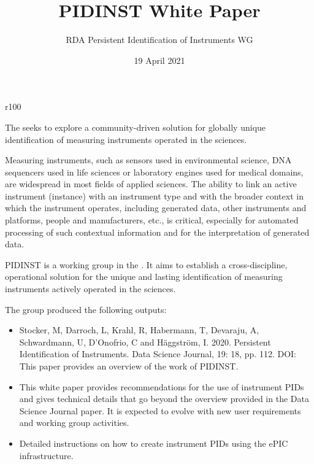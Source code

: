 \documentclass[a4paper,10pt,english]{sphinxmanual}
\title{PIDINST White Paper}
\date{19 April 2021}
\author{RDA Persistent Identification of Instruments WG}
\let\sphinxpxdimen\pdfpxdimen\else\newdimen\sphinxpxdimen
\begin{document}
\pagestyle{empty}
\sphinxmaketitle

\pagestyle{plain}
\label{\detokenize{index::doc}}
\begin{wrapfigure}{r}{100\sphinxpxdimen}
  \sphinxincludegraphics[width=100\sphinxpxdimen]{{pidinst-logo}.pdf}
\end{wrapfigure}
The  seeks to explore a community-driven solution for globally
unique identification of measuring instruments operated in the
sciences.

Measuring instruments, such as sensors used in environmental science,
DNA sequencers used in life sciences or laboratory engines used for
medical domains, are widespread in most fields of applied sciences.
The ability to link an active instrument (instance) with an instrument
type and with the broader context in which the instrument operates,
including generated data, other instruments and platforms, people and
manufacturers, etc., is critical, especially for automated processing
of such contextual information and for the interpretation of generated
data.

PIDINST is a working group in the .  It aims to establish a cross-discipline, operational
solution for the unique and lasting identification of measuring
instruments actively operated in the sciences.

The group produced the following outputs:
\begin{itemize}
\item {} 
Stocker, M, Darroch, L, Krahl, R, Habermann, T, Devaraju, A,
Schwardmann, U, D’Onofrio, C and Häggström, I.  2020.  Persistent
Identification of Instruments.  Data Science Journal, 19: 18,
pp. 1\textendash{}12.  DOI:  
This paper provides an overview of the work of PIDINST.

\item {} 
{\hyperref[\detokenize{white-paper/index:white-paper}]{}} 
This white paper provides recommendations for the use of instrument
PIDs and gives technical details that go beyond the overview
provided in the Data Science Journal paper.  It is expected to
evolve with new user requirements and working group activities.

\item {} 
{\hyperref[\detokenize{cookbook/index:epic-cookbook}]{}} 
Detailed instructions on how to create instrument PIDs using the
ePIC infrastructure.

\end{itemize}
\bigskip
\end{document}
